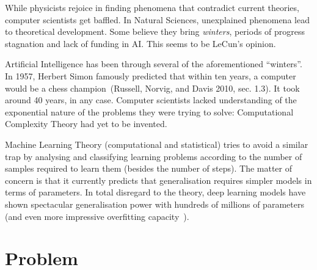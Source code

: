 \documentclass[
  letterpaper,
  12pt,
  british]{tufte-book}
\theoremstyle{plain}
\theoremstyle{definition}
\theoremstyle{plain}
\theoremstyle{remark}
\begin{document}
While physicists rejoice in finding phenomena that contradict current
theories, computer scientists get baffled. In Natural Sciences,
unexplained phenomena lead to theoretical development. Some believe they
bring \emph{winters}, periods of progress stagnation and lack of funding
in {AI}. This seems to be LeCun's opinion.

Artificial Intelligence has been through several of the aforementioned
``winters''. In 1957, Herbert Simon famously predicted that within ten years, a computer would be a
chess champion~(Russell, Norvig, and Davis 2010, sec.
1.3).
It took around 40 years, in any case. Computer scientists lacked
understanding of the exponential nature of the problems they were trying
to solve: Computational Complexity Theory had yet to be invented.

Machine Learning Theory (computational and statistical) tries to avoid a
similar trap by analysing and classifying learning problems according to
the number of samples required to learn them (besides the number of
steps). The matter of concern is that it currently predicts that
generalisation requires simpler models in terms of parameters. In total
disregard to the theory, deep learning models have shown spectacular
generalisation power with hundreds of millions of parameters (and even
more impressive overfitting capacity~).

\hypertarget{problem}{%
\section{Problem}\label{problem}}
\end{document}
